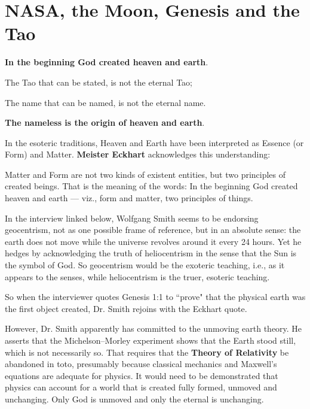 \section{NASA, the Moon, Genesis and the Tao}

\begin{quotex}
\textbf{In the beginning God created heaven and earth}. 

The Tao that can be stated, is not the eternal Tao;

The name that can be named, is not the eternal name.

\textbf{The nameless is the origin of heaven and earth}. 

\end{quotex}
In the esoteric traditions, Heaven and Earth have been interpreted as Essence (or Form) and Matter. \textbf{Meister Eckhart} acknowledges this understanding:

\begin{quotex}
Matter and Form are not two kinds of existent entities, but two principles of created beings. That is the meaning of the words: In the beginning God created heaven and earth — viz., form and matter, two principles of things. 

\end{quotex}
In the interview linked below, Wolfgang Smith seems to be endorsing geocentrism, not as one possible frame of reference, but in an absolute sense: the earth does not move while the universe revolves around it every 24 hours. Yet he hedges by acknowledging the truth of heliocentrism in the sense that the Sun is the symbol of God. So geocentrism would be the exoteric teaching, i.e., as it appears to the senses, while heliocentrism is the truer, esoteric teaching.

So when the interviewer quotes Genesis 1:1 to ``prove" that the physical earth was the first object created, Dr. Smith rejoins with the Eckhart quote.

However, Dr. Smith apparently has committed to the unmoving earth theory. He asserts that the Michelson–Morley experiment shows that the Earth stood still, which is not necessarily so. That requires that the \textbf{Theory of Relativity} be abandoned in toto, presumably because classical mechanics and Maxwell's equations are adequate for physics. It would need to be demonstrated that physics can account for a world that is created fully formed, unmoved and unchanging. Only God is unmoved and only the eternal is unchanging.

